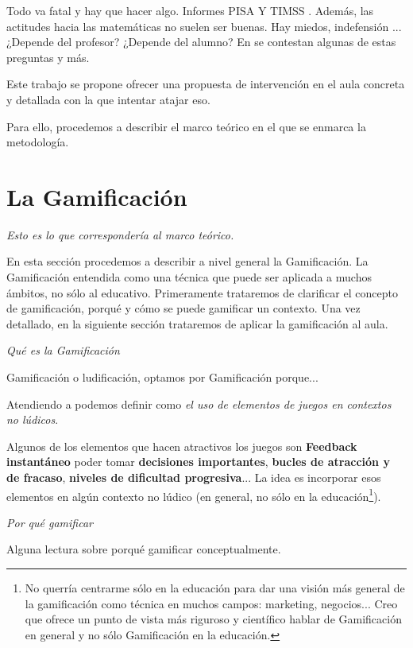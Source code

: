 \documentclass[a4paper, 12pt]{book}
\newcommand{\coment}[1]{\textit{#1}}
\begin{document}
Todo va fatal y hay que hacer algo. 
%
Informes PISA \cite{InformePisa} Y TIMSS \cite{InformeTimss}.
%
Además, las actitudes hacia las matemáticas no suelen ser buenas. Hay miedos, indefensión ... ¿Depende del profesor? ¿Depende del alumno? En \cite{ActitudesHaciaMates} se contestan algunas de estas preguntas y más.

Este trabajo se propone ofrecer una propuesta de intervención en el aula concreta y detallada con la que intentar atajar eso.

Para ello, procedemos a describir el marco teórico en el que se enmarca la metodología.


\section{La Gamificación}



\coment{Esto es lo que correspondería al marco teórico.}

En esta sección procedemos a describir a nivel general la Gamificación. 
%
La Gamificación entendida como una técnica que puede ser aplicada a muchos ámbitos, no sólo al educativo. 
%
Primeramente trataremos de clarificar el concepto de gamificación, porqué y cómo se puede gamificar un contexto.
%
Una vez detallado, en la siguiente sección trataremos de aplicar la gamificación al aula.



\coment{Qué es la Gamificación}

Gamificación o ludificación, optamos por Gamificación porque...

Atendiendo a \cite{GamificationDef} podemos definir  como \textit{el uso de elementos de juegos en contextos no lúdicos}. 

Algunos de los elementos que hacen atractivos los juegos son
\textbf{Feedback instantáneo}
poder tomar \textbf{decisiones importantes},
\textbf{bucles de atracción y de fracaso},
\textbf{niveles de dificultad progresiva}... La idea es incorporar esos elementos en algún contexto no lúdico (en general, no sólo en la educación\footnote{No querría centrarme sólo en la educación para dar una visión más general de la gamificación como técnica en muchos campos: marketing, negocios... Creo que ofrece un punto de vista más riguroso y científico hablar de Gamificación en general y no sólo Gamificación en la educación.}).


\coment{Por qué gamificar}

Alguna lectura sobre porqué gamificar conceptualmente.
\end{document}
